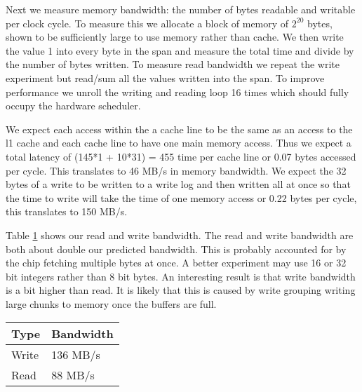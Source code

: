 Next we measure memory bandwidth: the number of bytes readable and writable per clock cycle.  
To measure this we allocate a block of memory of $2^{20}$ bytes, shown to be sufficiently large to use memory rather than cache.
We then write the value 1 into every byte in the span and measure the total time and divide by the number of bytes written.
To measure read bandwidth we repeat the write experiment but read/sum all the values written into the span.
To improve performance we unroll the writing and reading loop 16 times which should fully occupy the hardware scheduler.

We expect each access within the a cache line to be the same as an access to the l1 cache and each cache line to have one main memory access.  Thus we expect a total latency of (145*1 + 10*31) = 455 time per cache line or 0.07 bytes accessed per cycle.  This translates to 46 MB/s in memory bandwidth.
We expect the 32 bytes of a write to be written to a write log and then written all at once so that the time to write will take the time of one memory access or 0.22 bytes per cycle, this translates to 150 MB/s.

Table \ref{tab:exp_2_2} shows our read and write bandwidth.  The read and write bandwidth are both about double our predicted bandwidth.  This is probably accounted for by the chip fetching multiple bytes at once.  A better experiment may use 16 or 32 bit integers rather than 8 bit bytes.  An interesting result is that write bandwidth is a bit higher than read.  It is likely that this is caused by write grouping writing large chunks to memory once the buffers are full. 

\begin{table}[h]
\label{tab:exp_2_2}
\begin{tabular}{|l|l|}
\hline
Type  & Bandwidth        \\\hline
Write & 136 MB/s\\\hline
Read  & 88 MB/s \\ \hline
\end{tabular}
\end{table}